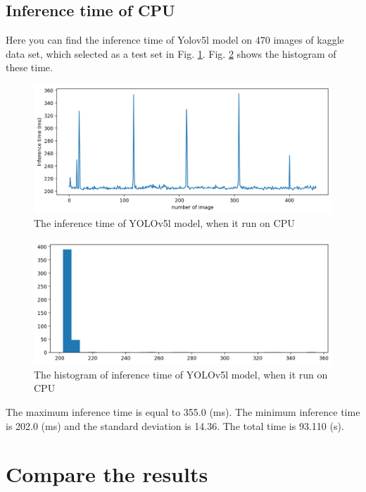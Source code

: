 \documentclass[12pt,a4paper]{article}
\begin{document}
\subsection*{Inference time of CPU}
Here you can find the inference time of Yolov5l model on 470 images of kaggle data set, which selected as a test set in Fig. \ref{fig: cpul}. Fig. \ref{fig: cpul_hist} shows the histogram of these time.
\begin{figure}[H]
    \centering
    \includegraphics[width=15cm]{figures/Inftime_yolov5L_cpu.png}
    \caption{The inference time of YOLOv5l model, when it run on CPU}
    \label{fig: cpul}
\end{figure}
\begin{figure}[H]
    \centering
    \includegraphics[width=15cm]{figures/Inftime_yolov5L_cpu_hist.png}
    \caption{The histogram of inference time of YOLOv5l model, when it run on CPU}
    \label{fig: cpul_hist}
\end{figure}
The maximum inference time is equal to 355.0 (ms). The minimum inference time is 202.0 (ms) and the standard deviation is 14.36. The total time is 93.110 (s).

\section*{Compare the results}
\end{document}
